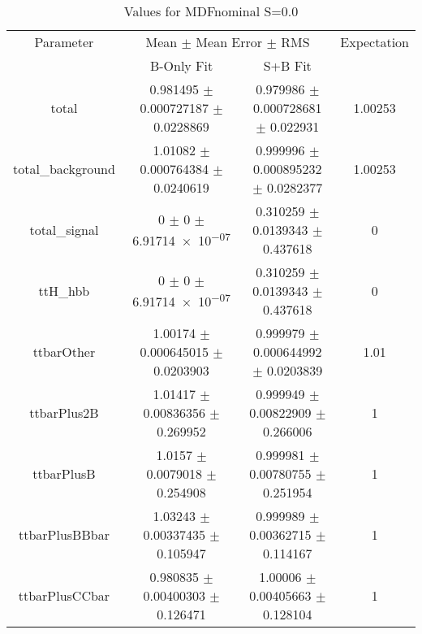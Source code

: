 \begin{table}
\centering
\caption{Values for MDFnominal S=0.0}
\begin{tabular}{cccc}
\toprule
Parameter & \multicolumn{2}{c}{Mean $\pm$ Mean Error $\pm$ RMS} & Expectation\\
 & B-Only Fit & S+B Fit & \\
\midrule
total & \num{0.981495} $\pm$ \num{0.000727187} $\pm$ \num{0.0228869} & \num{0.979986} $\pm$ \num{0.000728681} $\pm$ \num{0.022931} & \num{1.00253}\\
total\_background & \num{1.01082} $\pm$ \num{0.000764384} $\pm$ \num{0.0240619} & \num{0.999996} $\pm$ \num{0.000895232} $\pm$ \num{0.0282377} & \num{1.00253}\\
total\_signal & \num{0} $\pm$ \num{0} $\pm$ \num{6.91714e-07} & \num{0.310259} $\pm$ \num{0.0139343} $\pm$ \num{0.437618} & \num{0}\\
ttH\_hbb & \num{0} $\pm$ \num{0} $\pm$ \num{6.91714e-07} & \num{0.310259} $\pm$ \num{0.0139343} $\pm$ \num{0.437618} & \num{0}\\
ttbarOther & \num{1.00174} $\pm$ \num{0.000645015} $\pm$ \num{0.0203903} & \num{0.999979} $\pm$ \num{0.000644992} $\pm$ \num{0.0203839} & \num{1.01}\\
ttbarPlus2B & \num{1.01417} $\pm$ \num{0.00836356} $\pm$ \num{0.269952} & \num{0.999949} $\pm$ \num{0.00822909} $\pm$ \num{0.266006} & \num{1}\\
ttbarPlusB & \num{1.0157} $\pm$ \num{0.0079018} $\pm$ \num{0.254908} & \num{0.999981} $\pm$ \num{0.00780755} $\pm$ \num{0.251954} & \num{1}\\
ttbarPlusBBbar & \num{1.03243} $\pm$ \num{0.00337435} $\pm$ \num{0.105947} & \num{0.999989} $\pm$ \num{0.00362715} $\pm$ \num{0.114167} & \num{1}\\
ttbarPlusCCbar & \num{0.980835} $\pm$ \num{0.00400303} $\pm$ \num{0.126471} & \num{1.00006} $\pm$ \num{0.00405663} $\pm$ \num{0.128104} & \num{1}\\
\bottomrule
\end{tabular}
\end{table}